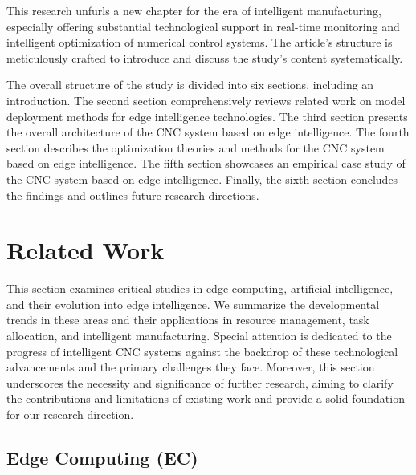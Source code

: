 \documentclass[preprint,12pt,authoryear]{elsarticle}
\begin{document}
This research unfurls a new chapter for the era of intelligent manufacturing, especially offering substantial technological support in real-time monitoring and intelligent optimization of numerical control systems. The article's structure is meticulously crafted to introduce and discuss the study's content systematically.
    
The overall structure of the study is divided into six sections, including an introduction. The second section comprehensively reviews related work on model deployment methods for edge intelligence technologies. The third section presents the overall architecture of the CNC system based on edge intelligence. The fourth section describes the optimization theories and methods for the CNC system based on edge intelligence. The fifth section showcases an empirical case study of the CNC system based on edge intelligence. Finally, the sixth section concludes the findings and outlines future research directions.

\section{Related Work}

This section examines critical studies in edge computing, artificial intelligence, and their evolution into edge intelligence. We summarize the developmental trends in these areas and their applications in resource management, task allocation, and intelligent manufacturing.  Special attention is dedicated to the progress of intelligent CNC systems against the backdrop of these technological advancements and the primary challenges they face.  Moreover, this section underscores the necessity and significance of further research, aiming to clarify the contributions and limitations of existing work and provide a solid foundation for our research direction.

\subsection{Edge Computing (EC)}
\end{document}
